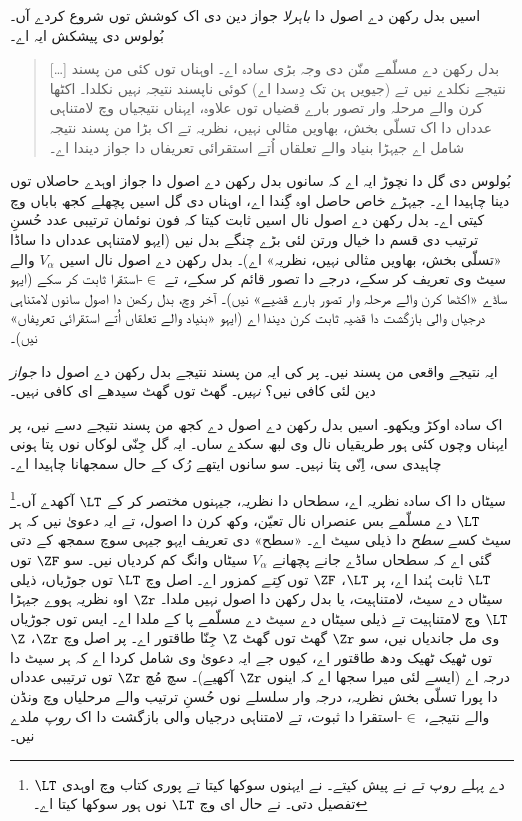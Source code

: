 \documentclass[../../../include/open-logic-section]{subfiles}
\begin{document}

اسیں بدل رکھن دے اصول دا \emph{باہرلا} جواز دین دی اک کوشش توں شروع کردے آں۔ بُولوس دی پیشکش ایہ اے۔
\begin{quote}
  [\ldots] بدل رکھن دے مسلّمے منّن دی وجہ بڑی سادہ اے۔ اوہناں توں کئی من پسند نتیجے نکلدے نیں تے (جیویں ہن تک دِسدا اے) کوئی ناپسند نتیجہ نہیں نکلدا۔ اکٹھا کرن والے مرحلہ وار تصور بارے قضیاں توں علاوہ، ایہناں نتیجیاں وچ لامتناہی عدداں دا اک تسلّی بخش، بھاویں مثالی نہیں، نظریہ تے اک بڑا من پسند نتیجہ شامل اے جیہڑا بنیاد والے تعلقاں اُتے استقرائی تعریفاں دا جواز دیندا اے۔
  \citep[229]{Boolos1971}
\end{quote}
بُولوس دی گل دا نچوڑ ایہ اے کہ سانوں بدل رکھن دے اصول دا جواز اوہدے حاصلاں توں دینا چاہیدا اے۔ جیہڑے خاص حاصل اوہ گِندا اے، اوہناں دی گل اسیں پچھلے کجھ باباں وچ کیتی اے۔ بدل رکھن دے اصول نال اسیں ثابت کیتا کہ فون نوئمان ترتیبی عدد حُسنِ ترتیب دی قسم دا خیال ورتن لئی بڑے چنگے بدل نیں (ایہو لامتناہی عدداں دا ساڈا «تسلّی بخش، بھاویں مثالی نہیں، نظریہ» اے)۔ بدل رکھن دے اصول نال اسیں $V_\alpha$ والے سیٹ وی تعریف کر سکے، درجے دا تصور قائم کر سکے، تے $\in$-استقرا ثابت کر سکے (ایہو ساڈے «اکٹھا کرن والے مرحلہ وار تصور بارے قضیے» نیں)۔ آخر وچ، بدل رکھن دا اصول سانوں لامتناہی درجیاں والی بازگشت دا قضیہ ثابت کرن دیندا اے (ایہو «بنیاد والے تعلقاں اُتے استقرائی تعریفاں» نیں)۔

ایہ نتیجے واقعی من پسند نیں۔ پر کی ایہ من پسند نتیجے بدل رکھن دے اصول دا \emph{جواز} دین لئی کافی نیں؟ \emph{نہیں}۔ گھٹ توں گھٹ سیدھے ای کافی نہیں۔

اک سادہ اوکڑ ویکھو۔ اسیں بدل رکھن دے اصول دے کجھ من پسند نتیجے دسے نیں، پر ایہناں وچوں کئی ہور طریقیاں نال وی لبھ سکدے ساں۔ ایہ گل جِنّی لوکاں نوں پتا ہونی چاہیدی سی، اِنّی پتا نہیں۔ سو سانوں ایتھے رُک کے حال سمجھانا چاہیدا اے۔

سیٹاں دا اک سادہ نظریہ اے، سطحاں دا نظریہ، جیہنوں مختصر کر کے $\LT$ آکھدے آں۔\footnote{$\LT$ دے پہلے روپ \citet{Montague1965} تے \citet{Scott1974} نے پیش کیتے۔ \citet{Potter2004} نے ایہنوں سوکھا کیتا تے پوری کتاب وچ اوہدی تفصیل دتی۔ \citet{ButtonLT1} نے حال ای وچ $\LT$ نوں ہور سوکھا کیتا اے۔} $\LT$ دے مسلّمے بس عنصراں نال تعیّن، وکھ کرن دا اصول، تے ایہ دعویٰ نیں کہ ہر سیٹ کسے \emph{سطح} دا ذیلی سیٹ اے۔ «سطح» دی تعریف ایہو جیہی سوچ سمجھ کے دتی گئی اے کہ سطحاں ساڈے جانے پچھانے $V_\alpha$ سیٹاں وانگ کم کردیاں نیں۔ سو $\ZF$ توں $\LT$ ثابت ہُندا اے، پر $\LT$، $\ZF$ توں \emph{کِتے} کمزور اے۔ اصل وچ $\LT$ توں جوڑیاں، ذیلی سیٹاں دے سیٹ، لامتناہیت، یا بدل رکھن دا اصول نہیں ملدا۔ $\Zr$ اوہ نظریہ ہووے جیہڑا $\LT$ وچ لامتناہیت تے ذیلی سیٹاں دے سیٹ دے مسلّمے پا کے ملدا اے۔ ایس توں جوڑیاں وی مل جاندیاں نیں، سو $\Zr$ گھٹ توں گھٹ $\Z$ جِنّا طاقتور اے۔ پر اصل وچ $\Zr$، $\Z$ توں ٹھیک ٹھیک ودھ طاقتور اے، کیوں جے ایہ دعویٰ وی شامل کردا اے کہ ہر سیٹ دا درجہ اے (ایسے لئی میرا سجھا اے کہ اینوں $\Zr$ آکھیے)۔ سچ مُچ $\Zr$ توں ترتیبی عدداں دا پورا تسلّی بخش نظریہ، درجہ وار سلسلے نوں حُسنِ ترتیب والے مرحلیاں وچ ونڈن والے نتیجے، $\in$-استقرا دا ثبوت، تے لامتناہی درجیاں والی بازگشت دا اک \emph{روپ} ملدے نیں۔
\end{document}
